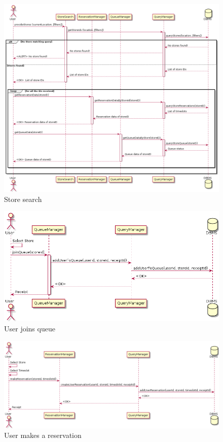 \begin{figure}[H]
    \includegraphics[width=\linewidth]{uml/seq_search_store.png}
    \caption{Store search}
    \label{fig:seq_store_search}
\end{figure}

\begin{figure}[H]
    \includegraphics[width=\linewidth]{uml/seq_join_queue.png}
    \caption{User joins queue}
    \label{fig:seq_join_queue}
\end{figure}

\begin{figure}[H]
    \includegraphics[width=\linewidth]{uml/seq_make_reservation.png}
    \caption{User makes a reservation}
    \label{fig:seq_make_reservation}
\end{figure}


